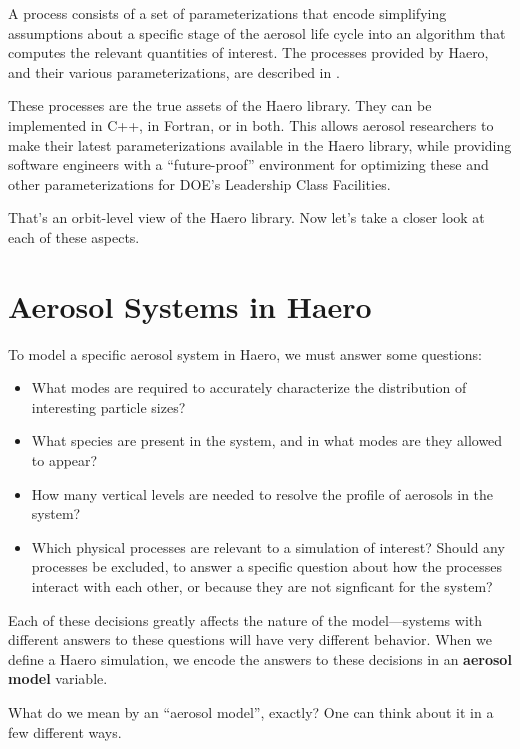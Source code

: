 A process consists of a set of parameterizations that encode simplifying
assumptions about a specific stage of the aerosol life cycle into an algorithm
that computes the relevant quantities of interest. The processes provided by
Haero, and their various parameterizations, are described in .

These processes are the true assets of the Haero library. They can be
implemented in C++, in Fortran, or in both. This allows aerosol researchers to
make their latest parameterizations available in the Haero library, while
providing software engineers with a ``future-proof'' environment for optimizing
these and other parameterizations for DOE's Leadership Class Facilities.

That's an orbit-level view of the Haero library. Now let's take a closer look at
each of these aspects.

\section{Aerosol Systems in Haero}

To model a specific aerosol system in Haero, we must answer some questions:

\begin{itemize}
  \item What modes are required to accurately characterize the distribution of
        interesting particle sizes?
  \item What species are present in the system, and in what modes are they
        allowed to appear?
  \item How many vertical levels are needed to resolve the profile of aerosols
        in the system?
  \item Which physical processes are relevant to a simulation of interest?
        Should any processes be excluded, to answer a specific question about
        how the processes interact with each other, or because they are not
        signficant for the system?
\end{itemize}

Each of these decisions greatly affects the nature of the model---systems with
different answers to these questions will have very different behavior. When we
define a Haero simulation, we encode the answers to these decisions in an
{\bf aerosol model} variable.

What do we mean by an ``aerosol model'', exactly? One can think about it in a
few different ways.

